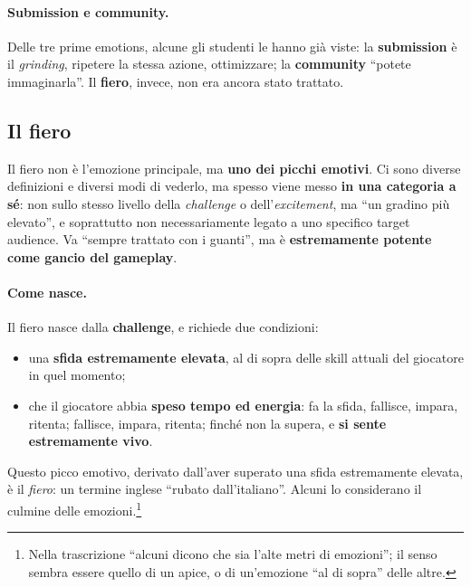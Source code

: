 \paragraph{Submission e community.} Delle tre prime emotions, alcune gli
studenti le hanno già viste: la \textbf{submission} è il \emph{grinding},
ripetere la stessa azione, ottimizzare; la \textbf{community} ``potete
immaginarla''. Il \textbf{fiero}, invece, non era ancora stato trattato.

\subsection{Il fiero}

Il fiero non è l'emozione principale, ma \textbf{uno dei picchi emotivi}. Ci
sono diverse definizioni e diversi modi di vederlo, ma spesso viene messo
\textbf{in una categoria a sé}: non sullo stesso livello della
\emph{challenge} o dell'\emph{excitement}, ma ``un gradino più elevato'', e
soprattutto non necessariamente legato a uno specifico target audience. Va
``sempre trattato con i guanti'', ma è \textbf{estremamente potente come
gancio del gameplay}.

\paragraph{Come nasce.} Il fiero nasce dalla \textbf{challenge}, e richiede
due condizioni:
\begin{itemize}
  \item una \textbf{sfida estremamente elevata}, al di sopra delle skill
        attuali del giocatore in quel momento;
  \item che il giocatore abbia \textbf{speso tempo ed energia}: fa la
        sfida, fallisce, impara, ritenta; fallisce, impara, ritenta; finché
        non la supera, e \textbf{si sente estremamente vivo}.
\end{itemize}
Questo picco emotivo, derivato dall'aver superato una sfida estremamente
elevata, è il \emph{fiero}: un termine inglese ``rubato dall'italiano''.
Alcuni lo considerano il culmine delle emozioni.\footnote{Nella trascrizione
``alcuni dicono che sia l'alte metri di emozioni''; il senso sembra essere
quello di un apice, o di un'emozione ``al di sopra'' delle altre.}

